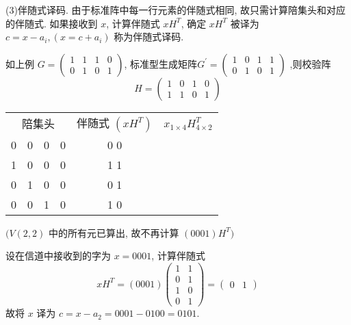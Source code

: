 (3)伴随式译码. 由于标准阵中每一行元素的伴随式相同, 故只需计算陪集头和对应的伴随式. 如果接收到 $ x $, 计算伴随式 $ x H^{T} $, 确定 $ x H^{T} $ 被译为 $ c=x-a_{i},\left(x=c+a_{i}\right) $ 称为伴随式译码.

\begin{example}
    如上例 $ G=\left(\begin{array}{llll}1 & 1 & 1 & 0 \\ 0 & 1 & 0 & 1\end{array}\right) $, 标准型生成矩阵$ G^{\prime}=\left(\begin{array}{llll}1 & 0 & 1 & 1 \\ 0 & 1 & 0 & 1\end{array}\right) $ ,则校验阵 $$ H=\left(\begin{array}{llll}1 & 0 & 1 & 0 \\ 1 & 1 & 0 & 1\end{array}\right) $$

    \begin{center}
\begin{tabular}{cccccc}
\multicolumn{4}{c}{ 陪集头 } & 伴随式 $ \left(x H^{T}\right) $ & $ x_{1 \times 4} H_{4 \times 2}^{T} $ \\
0 & 0 & 0 & 0 & 0  0 &\\
1 & 0 & 0 & 0 & 1  1 &\\
0 & 1 & 0 & 0 & 0  1 &\\
0 & 0 & 1 & 0 & 1  0 &
\end{tabular}
\end{center}
$ (V(2,2) $ 中的所有元已算出, 故不再计算 $(0001) H^{T}) $

设在信道中接收到的字为 $ x=0001 $, 计算伴随式
$$
x H^{T}=(0001)\left(\begin{array}{ll}
1 & 1 \\
0 & 1 \\
1 & 0 \\
0 & 1
\end{array}\right)=\left(\begin{array}{ll}
0 & 1
\end{array}\right)
$$
故将 $ x $ 译为 $ c=x-a_{2}=0001-0100=0101 $.
\end{example}


